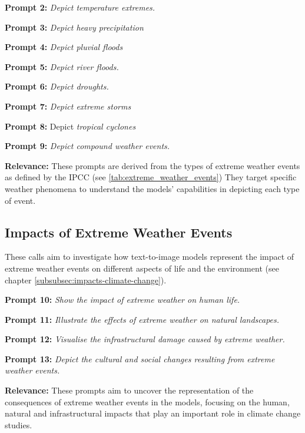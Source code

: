 \begin{description}
\item \textbf{Prompt 2:} \textit{Depict temperature extremes.}
\item \textbf{Prompt 3:} \textit{Depict heavy precipitation}
\item \textbf{Prompt 4:} \textit{Depict pluvial floods}
\item \textbf{Prompt 5:} \textit{Depict river floods.}
\item \textbf{Prompt 6:} \textit{Depict droughts.}
\item \textbf{Prompt 7:} \textit{Depict extreme storms}
\item \textbf{Prompt 8:} Depict \textit{tropical cyclones}
\item \textbf{Prompt 9:} \textit{Depict compound weather events.}
\end{description}
\textbf{Relevance:} These prompts are derived from the types of extreme weather events as defined by the IPCC (see \ref{tab:extreme_weather_events}) They target specific weather phenomena to understand the models' capabilities in depicting each type of event.

\subsection{Impacts of Extreme Weather Events}
These calls aim to investigate how text-to-image models represent the impact of extreme weather events on different aspects of life and the environment (see chapter \ref{subsubsec:impacts-climate-change}).

\begin{description}
\item \textbf{Prompt 10:} \textit{Show the impact of extreme weather on human life.}
\item \textbf{Prompt 11:} \textit{Illustrate the effects of extreme weather on natural landscapes.}
\item \textbf{Prompt 12:} \textit{Visualise the infrastructural damage caused by extreme weather.}
\item \textbf{Prompt 13:} \textit{Depict the cultural and social changes resulting from extreme weather events.}
\end{description}
\textbf{Relevance:} These prompts aim to uncover the representation of the consequences of extreme weather events in the models, focusing on the human, natural and infrastructural impacts that play an important role in climate change studies.


